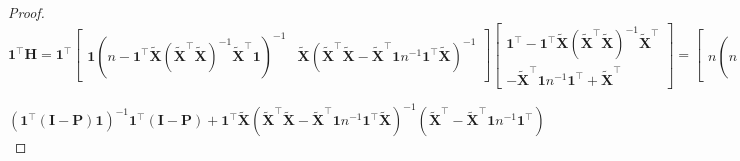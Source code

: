 \documentclass{beamer}
\begin{document}
\begin{proof}
$\mathbf{1}^\top\mathbf{H}=\mathbf{1}^\top\begin{bmatrix}
\mathbf{1}(n-\mathbf{1}^\top\mathbf{\tilde{X}}(\mathbf{\tilde{X}}^\top\mathbf{\tilde{X}})^{-1}\mathbf{\tilde{X}}^\top\mathbf{1})^{-1} &  \mathbf{\tilde{X}}(\mathbf{\tilde{X}}^\top\mathbf{\tilde{X}}-\mathbf{\tilde{X}}^\top\mathbf{1}n^{-1}\mathbf{1}^\top\mathbf{\tilde{X}})^{-1}\end{bmatrix}\begin{bmatrix}\mathbf{1}^\top-\mathbf{1}^\top\mathbf{\tilde{X}}(\mathbf{\tilde{X}}^\top\mathbf{\tilde{X}})^{-1}\mathbf{\tilde{X}}^\top \\
-\mathbf{\tilde{X}}^\top\mathbf{1}n^{-1}\mathbf{1}^\top+\mathbf{\tilde{X}}^\top
\end{bmatrix}=\begin{bmatrix}
n(n-\mathbf{1}^\top\mathbf{\tilde{X}}(\mathbf{\tilde{X}}^\top\mathbf{\tilde{X}})^{-1}\mathbf{\tilde{X}}^\top\mathbf{1})^{-1} &  \mathbf{1}^\top\mathbf{\tilde{X}}(\mathbf{\tilde{X}}^\top\mathbf{\tilde{X}}-\mathbf{\tilde{X}}^\top\mathbf{1}n^{-1}\mathbf{1}^\top\mathbf{\tilde{X}})^{-1}\end{bmatrix}\begin{bmatrix}\mathbf{1}^\top-\mathbf{1}^\top\mathbf{\tilde{X}}(\mathbf{\tilde{X}}^\top\mathbf{\tilde{X}})^{-1}\mathbf{\tilde{X}}^\top \\
-\mathbf{\tilde{X}}^\top\mathbf{1}n^{-1}\mathbf{1}^\top+\mathbf{\tilde{X}}^\top
\end{bmatrix}$

$(\mathbf{1}^\top(\mathbf{I}-\mathbf{P})\mathbf{1})^{-1}\mathbf{1}^\top(\mathbf{I}-\mathbf{P})+\mathbf{1}^\top\mathbf{\tilde{X}}(\mathbf{\tilde{X}}^\top\mathbf{\tilde{X}}-\mathbf{\tilde{X}}^\top\mathbf{1}n^{-1}\mathbf{1}^\top\mathbf{\tilde{X}})^{-1}(\mathbf{\tilde{X}}^\top-\mathbf{\tilde{X}}^\top\mathbf{1}n^{-1}\mathbf{1}^\top)$
\end{proof}
\fi
\end{document}
